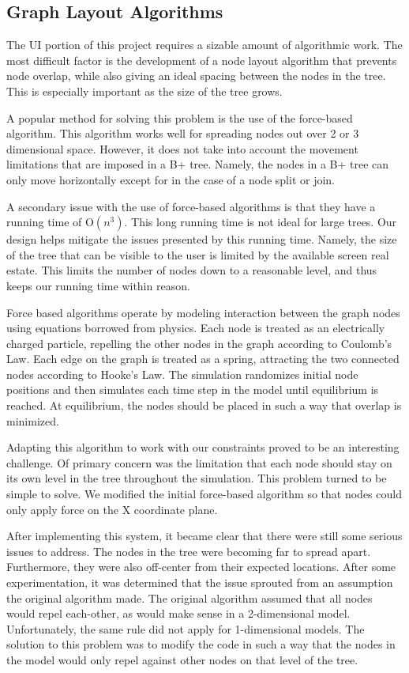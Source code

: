 \subsection{Graph Layout Algorithms}
The UI portion of this project requires a sizable amount of
algorithmic work. The most difficult factor is the development of a
node layout algorithm that prevents node overlap, while also giving an
ideal spacing between the nodes in the tree. This is especially
important as the size of the tree grows.

A popular method for solving this problem is the use of the
force-based algorithm. This algorithm works well for spreading nodes
out over 2 or 3 dimensional space. However, it does not take into
account the movement limitations that are imposed in a B+
tree. Namely, the nodes in a B+ tree can only move horizontally except
for in the case of a node split or join.

A secondary issue with the use of force-based algorithms is that they
have a running time of O$(n^3)$. This long running time is not ideal
for large trees. Our design helps mitigate the issues presented by
this running time. Namely, the size of the tree that can be visible to
the user is limited by the available screen real estate. This limits
the number of nodes down to a reasonable level, and thus keeps our
running time within reason.

Force based algorithms operate by modeling interaction between the
graph nodes using equations borrowed from physics. Each node is
treated as an electrically charged particle, repelling the other nodes
in the graph according to Coulomb's Law. Each edge on the graph is
treated as a spring, attracting the two connected nodes according to
Hooke's Law. The simulation randomizes initial node positions and then
simulates each time step in the model until equilibrium is reached. At
equilibrium, the nodes should be placed in such a way that overlap is
minimized.

Adapting this algorithm to work with our constraints proved to be an
interesting challenge. Of primary concern was the limitation that each
node should stay on its own level in the tree throughout the
simulation. This problem turned to be simple to solve. We modified the
initial force-based algorithm so that nodes could only apply force on
the X coordinate plane.

After implementing this system, it became clear that there were still
some serious issues to address. The nodes in the tree were becoming
far to spread apart. Furthermore, they were also off-center from their
expected locations. After some experimentation, it was determined that
the issue sprouted from an assumption the original algorithm made. The
original algorithm assumed that all nodes would repel each-other, as
would make sense in a 2-dimensional model. Unfortunately, the same
rule did not apply for 1-dimensional models. The solution to this
problem was to modify the code in such a way that the nodes in the
model would only repel against other nodes on that level of the tree.

